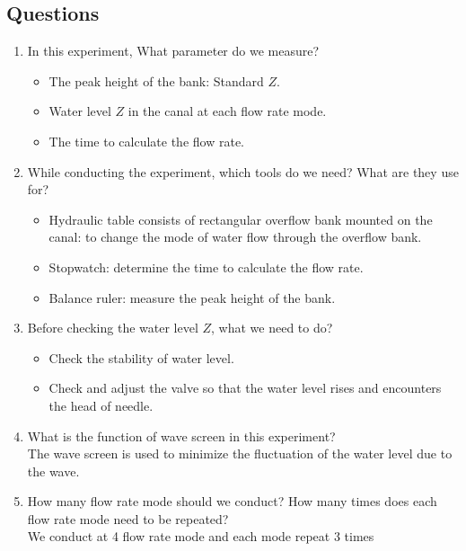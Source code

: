 \subsection{Questions}
\begin{enumerate}
	\item In this experiment, What parameter do we measure?
	\begin{itemize}[label=-]
		\item The peak height of the bank: Standard $Z$.
		\item Water level $Z$ in the canal at each flow rate mode.
		\item The time to calculate the flow rate.
	\end{itemize}
	\item While conducting the experiment, which tools do we need? What are they use for?
	\begin{itemize}[label=-]
		\item Hydraulic table consists of rectangular overflow bank mounted on the canal: to change the mode of water flow through the overflow bank.
		\item Stopwatch: determine the time to calculate the flow rate.
		\item Balance ruler: measure the peak height of the bank.
	\end{itemize}
	\item Before checking the water level $Z$, what we need to do?
	\begin{itemize}[label=-]
		\item Check the stability of water level.
		\item Check and adjust the valve so that the water level rises and encounters the head of needle.
	\end{itemize}
	\item What is the function of wave screen in this experiment?\\
	The wave screen is used  to minimize the fluctuation of the water level due to the wave.
	\item How many flow rate mode should we conduct? How many times does each flow rate mode need to be repeated?\\
	We conduct at 4 flow rate mode and each mode repeat 3 times
\end{enumerate}
